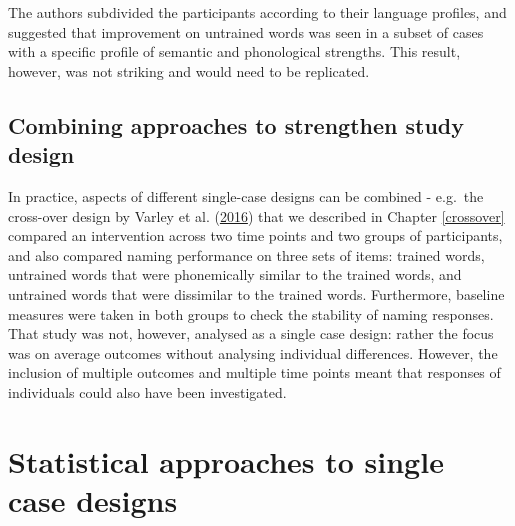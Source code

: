 \documentclass{krantz}
\begin{document}
The authors subdivided the participants according to their language profiles, and suggested that improvement on untrained words was seen in a subset of cases with a specific profile of semantic and phonological strengths. This result, however, was not striking and would need to be replicated.

\hypertarget{combining-approaches-to-strengthen-study-design}{%
\subsection{Combining approaches to strengthen study design}\label{combining-approaches-to-strengthen-study-design}}

In practice, aspects of different single-case designs can be combined - e.g.~the cross-over design by Varley et al. (\protect\hyperlink{ref-varley2016}{2016}) that we described in Chapter \ref{crossover} compared an intervention across two time points and two groups of participants, and also compared naming performance on three sets of items: trained words, untrained words that were phonemically similar to the trained words, and untrained words that were dissimilar to the trained words. Furthermore, baseline measures were taken in both groups to check the stability of naming responses. That study was not, however, analysed as a single case design: rather the focus was on average outcomes without analysing individual differences. However, the inclusion of multiple outcomes and multiple time points meant that responses of individuals could also have been investigated.

\hypertarget{statistical-approaches-to-single-case-designs}{%
\section{Statistical approaches to single case designs}\label{statistical-approaches-to-single-case-designs}}
\end{document}
